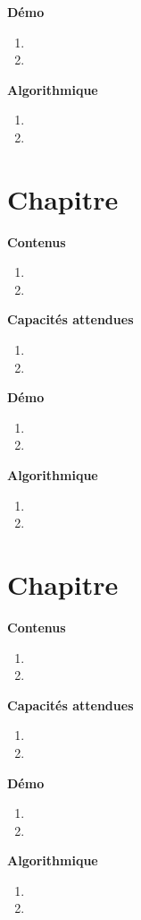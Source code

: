 \documentclass[10pt,a4paper]{article}
\begin{document}
\textbf{Démo}

\begin{enumerate}
\item 
\item 
\end{enumerate}

\textbf{Algorithmique}

\begin{enumerate}
\item 
\item 
\end{enumerate}

\section{Chapitre}

\textbf{Contenus}

\begin{enumerate} 
\item 
\item 
\end{enumerate}


\textbf{Capacités attendues}

\begin{enumerate}
\item 
\item 
\end{enumerate}

\textbf{Démo}

\begin{enumerate}
\item 
\item 
\end{enumerate}

\textbf{Algorithmique}

\begin{enumerate}
\item 
\item 
\end{enumerate}

\section{Chapitre}

\textbf{Contenus}

\begin{enumerate} 
\item 
\item 
\end{enumerate}


\textbf{Capacités attendues}

\begin{enumerate}
\item 
\item 
\end{enumerate}

\textbf{Démo}

\begin{enumerate}
\item 
\item 
\end{enumerate}

\textbf{Algorithmique}

\begin{enumerate}
\item 
\item 
\end{enumerate}
\end{document}
